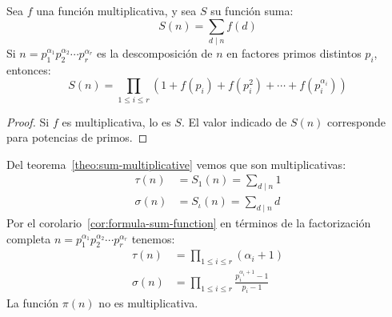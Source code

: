   \begin{corollary}
    \label{cor:formula-sum-function}
    Sea \(f\) una función multiplicativa,%
    y sea \(S\) su función suma:%
    \begin{equation*}
      S (n)
	= \sum_{d \mid n} f(d)
    \end{equation*}
    Si \(n = p_1^{\alpha_1} p_2^{\alpha_2} \dotsm p_r^{\alpha_r}\)
    es la descomposición de \(n\)
    en factores primos distintos \(p_i\),
    entonces:
    \begin{equation*}
      S (n)
	= \prod_{1 \le i \le r}
	    \left(
	      1 + f(p_i) + f(p_i^2) + \dotsb + f(p_i^{\alpha_i})
	    \right)
    \end{equation*}
  \end{corollary}
  \begin{proof}
    Si \(f\) es multiplicativa,
    lo es \(S\).
    El valor indicado de \(S(n)\)
    corresponde para potencias de primos.
  \end{proof}
  Del teorema~\ref{theo:sum-multiplicative}
  vemos que son multiplicativas:%
  \begin{align*}
    \tau(n)
      &= S_1 (n)
       = \sum_{d \mid n} 1 \\
    \sigma(n)
      &= S_{\iota}(n)
       = \sum_{d \mid n} d
  \end{align*}
  Por el corolario~\ref{cor:formula-sum-function}
  en términos de la factorización completa
    \(n = p_1^{\alpha_1} p_2^{\alpha_2} \dotsm p_r^{\alpha_r}\)
  tenemos:
  \begin{align*}
    \tau(n)
      &= \prod_{1 \le i \le r} (\alpha_i + 1) \\
    \sigma(n)
      &= \prod_{1 \le i \le r}
	   \frac{p_i^{\alpha_i + 1} - 1}{p_i - 1}
  \end{align*}
  La función \(\pi(n)\) no es multiplicativa.

